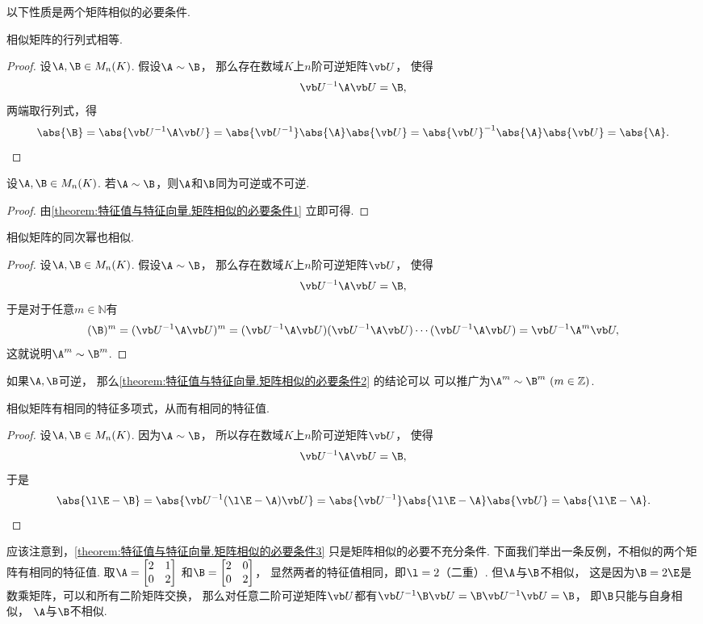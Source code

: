 以下性质是两个矩阵相似的必要条件.
\begin{property}\label{theorem:特征值与特征向量.矩阵相似的必要条件1}
相似矩阵的行列式相等.
\begin{proof}
设\(\A,\B \in M_n(K)\).
假设\(\A\sim\B\)，
那么存在数域\(K\)上\(n\)阶可逆矩阵\(\P\)，
使得\[
	\P^{-1}\A\P=\B,
\]
两端取行列式，得\[
	\abs{\B} = \abs{\P^{-1}\A\P}
	= \abs{\P^{-1}}\abs{\A}\abs{\P}
	= \abs{\P}^{-1}\abs{\A}\abs{\P}
	= \abs{\A}.
	\qedhere
\]
\end{proof}
\end{property}
\begin{proposition}
设\(\A,\B \in M_n(K)\).
若\(\A\sim\B\)，则\(\A\)和\(\B\)同为可逆或不可逆.
\begin{proof}
由\cref{theorem:特征值与特征向量.矩阵相似的必要条件1} 立即可得.
\end{proof}
\end{proposition}

\begin{property}\label{theorem:特征值与特征向量.矩阵相似的必要条件2}
相似矩阵的同次幂也相似.
\begin{proof}
设\(\A,\B \in M_n(K)\).
假设\(\A\sim\B\)，
那么存在数域\(K\)上\(n\)阶可逆矩阵\(\P\)，
使得\[
	\P^{-1}\A\P=\B,
\]
于是对于任意\(m\in\mathbb{N}\)有\[
	(\B)^m = (\P^{-1}\A\P)^m
	= (\P^{-1}\A\P)(\P^{-1}\A\P)\dotsb(\P^{-1}\A\P)
	= \P^{-1}\A^m\P,
\]
这就说明\(\A^m \sim \B^m\).
\end{proof}
\end{property}
\begin{remark}
如果\(\A,\B\)可逆，
那么\cref{theorem:特征值与特征向量.矩阵相似的必要条件2} 的结论可以
可以推广为\(\A^m\sim\B^m\ (m\in\mathbb{Z})\).
\end{remark}

\begin{property}\label{theorem:特征值与特征向量.矩阵相似的必要条件3}
相似矩阵有相同的特征多项式，从而有相同的特征值.
\begin{proof}
设\(\A,\B \in M_n(K)\).
因为\(\A\sim\B\)，
所以存在数域\(K\)上\(n\)阶可逆矩阵\(\P\)，
使得\[
	\P^{-1}\A\P=\B,
\]
于是\[
	\abs{\l\E-\B}
	=\abs{\P^{-1}(\l\E-\A)\P}
	=\abs{\P^{-1}}\abs{\l\E-\A}\abs{\P}
	=\abs{\l\E-\A}.
	\qedhere
\]
\end{proof}
\end{property}

应该注意到，\cref{theorem:特征值与特征向量.矩阵相似的必要条件3} 只是矩阵相似的必要不充分条件.
下面我们举出一条反例，不相似的两个矩阵有相同的特征值.
取\(\A=\begin{bmatrix} 2 & 1 \\ 0 & 2 \end{bmatrix}\)
和\(\B=\begin{bmatrix} 2 & 0 \\ 0 & 2 \end{bmatrix}\)，
显然两者的特征值相同，即\(\l=2\)（二重）.
但\(\A\)与\(\B\)不相似，
这是因为\(\B=2\E\)是数乘矩阵，可以和所有二阶矩阵交换，
那么对任意二阶可逆矩阵\(\P\)都有\(\P^{-1}\B\P=\B\P^{-1}\P=\B\)，
即\(\B\)只能与自身相似，
\(\A\)与\(\B\)不相似.

